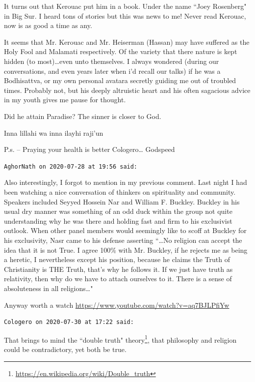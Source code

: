 \begin{footnotesize}
\begin{sffamily}
It turns out that Kerouac put him in a book. Under the name ``Joey Rosenberg" in Big Sur. I heard tons of stories but this was news to me! Never read Kerouac, now is as good a time as any.

It seems that Mr. Kerouac and Mr. Heiserman (Hassan) may have suffered as the Holy Fool and Malamati respectively. Of the variety that there nature is kept hidden (to most)…even unto themselves. I always wondered (during our conversations, and even years later when i'd recall our talks) if he was a Bodhisattva, or my own personal avatara secretly guiding me out of troubled times. Probably not, but his deeply altruistic heart and his often sagacious advice in my youth gives me pause for thought.

Did he attain Paradise? The sinner is closer to God.

Inna lillahi wa inna ilayhi raji'un

P.s. – Praying your health is better Cologero… Godspeed


\hfill

\texttt{AghorNath on 2020-07-28 at 19:56 said: }

Also interestingly, I forgot to mention in my previous comment. Last night I had been watching a nice conversation of thinkers on spirituality and community. Speakers included Seyyed Hossein Nar and William F. Buckley. Buckley in his usual dry manner was something of an odd duck within the group not quite understanding why he was there and holding fast and firm to his exclusivist outlook. When other panel members would seemingly like to scoff at Buckley for his exclusivity, Nasr came to his defense asserting ``…No religion can accept the idea that it is not True. I agree 100\% with Mr. Buckley, if he rejects me as being a heretic, I nevertheless except his position, because he claims the Truth of Christianity is THE Truth, that's why he follows it. If we just have truth as relativity, then why do we have to attach ourselves to it. There is a sense of absoluteness in all religions…"

Anyway worth a watch \url{https://www.youtube.com/watch?v=aq7BJLPfiYw}


\hfill

\texttt{Cologero on 2020-07-30 at 17:22 said: }

That brings to mind the ``double truth" theory\footnote{\url{https://en.wikipedia.org/wiki/Double_truth}}, that philosophy and religion could be contradictory, yet both be true.


\hfill


\end{sffamily}\end{footnotesize}
